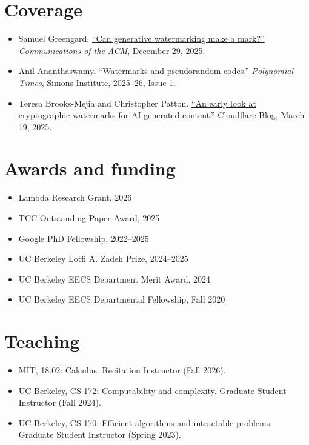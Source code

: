 \documentclass[line,margin]{res}
\begin{document}
\begin{resume}
\section{Coverage}
\begingroup
\normalfont
\begin{itemize}
  \item Samuel Greengard. \href{https://cacm.acm.org/news/can-generative-watermarking-make-a-mark/}{``Can generative watermarking make a mark?''} \emph{Communications of the ACM}, December 29, 2025.
  \item Anil Ananthaswamy. \href{https://simons.berkeley.edu/media/28058/download?inline#page=7}{``Watermarks and pseudorandom codes.''} \emph{Polynomial Times}, Simons Institute, 2025--26, Issue 1.
  \item Teresa Brooks-Mejia and Christopher Patton. \href{https://blog.cloudflare.com/an-early-look-at-cryptographic-watermarks-for-ai-generated-content/}{``An early look at cryptographic watermarks for AI-generated content.''} Cloudflare Blog, March 19, 2025.
\end{itemize}
\endgroup

\section{Awards and funding}
\begin{itemize}
  \item Lambda Research Grant, 2026
  \item TCC Outstanding Paper Award, 2025
  \item Google PhD Fellowship, 2022--2025
  \item UC Berkeley Lotfi A. Zadeh Prize, 2024--2025
  \item UC Berkeley EECS Department Merit Award, 2024
  \item UC Berkeley EECS Departmental Fellowship, Fall 2020
\end{itemize}

\section{Teaching}
\begin{itemize}
  \item MIT, 18.02: Calculus. Recitation Instructor (Fall 2026).
  \item UC Berkeley, CS 172: Computability and complexity. Graduate Student Instructor (Fall 2024).
  \item UC Berkeley, CS 170: Efficient algorithms and intractable problems. Graduate Student Instructor (Spring 2023).
\end{itemize}


\end{resume}
\end{document}
